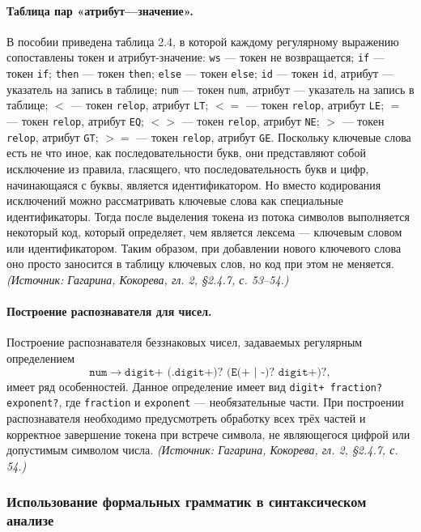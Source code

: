 \documentclass[a4paper,12pt]{article}
\begin{document}
\paragraph{Таблица пар «атрибут—значение».}
В пособии приведена таблица 2.4, в которой каждому регулярному выражению сопоставлены токен и атрибут-значение: \texttt{ws} — токен не возвращается; \texttt{if} — токен \texttt{if}; \texttt{then} — токен \texttt{then}; \texttt{else} — токен \texttt{else}; \texttt{id} — токен \texttt{id}, атрибут — указатель на запись в таблице; \texttt{num} — токен \texttt{num}, атрибут — указатель на запись в таблице; \(<\) — токен \texttt{relop}, атрибут \texttt{LT}; \(<=\) — токен \texttt{relop}, атрибут \texttt{LE}; \(=\) — токен \texttt{relop}, атрибут \texttt{EQ}; \(<>\) — токен \texttt{relop}, атрибут \texttt{NE}; \(>\) — токен \texttt{relop}, атрибут \texttt{GT}; \(>=\) — токен \texttt{relop}, атрибут \texttt{GE}. Поскольку ключевые слова есть не что иное, как последовательности букв, они представляют собой исключение из правила, гласящего, что последовательность букв и цифр, начинающаяся с буквы, является идентификатором. Но вместо кодирования исключений можно рассматривать ключевые слова как специальные идентификаторы. Тогда после выделения токена из потока символов выполняется некоторый код, который определяет, чем является лексема — ключевым словом или идентификатором. Таким образом, при добавлении нового ключевого слова оно просто заносится в таблицу ключевых слов, но код при этом не меняется.
\textit{(Источник: Гагарина, Кокорева, гл. 2, §2.4.7, с. 53--54.)}

\paragraph{Построение распознавателя для чисел.}
Построение распознавателя беззнаковых чисел, задаваемых регулярным определением
\[
\texttt{num}\to\texttt{digit+ (.digit+)? (E(+ | -)? digit+)?},
\]
имеет ряд особенностей. Данное определение имеет вид \texttt{digit+ fraction? exponent?}, где \texttt{fraction} и \texttt{exponent} — необязательные части. При построении распознавателя необходимо предусмотреть обработку всех трёх частей и корректное завершение токена при встрече символа, не являющегося цифрой или допустимым символом числа.
\textit{(Источник: Гагарина, Кокорева, гл. 2, §2.4.7, с. 54.)}

\subsubsection{Использование формальных грамматик в синтаксическом анализе}
\end{document}
